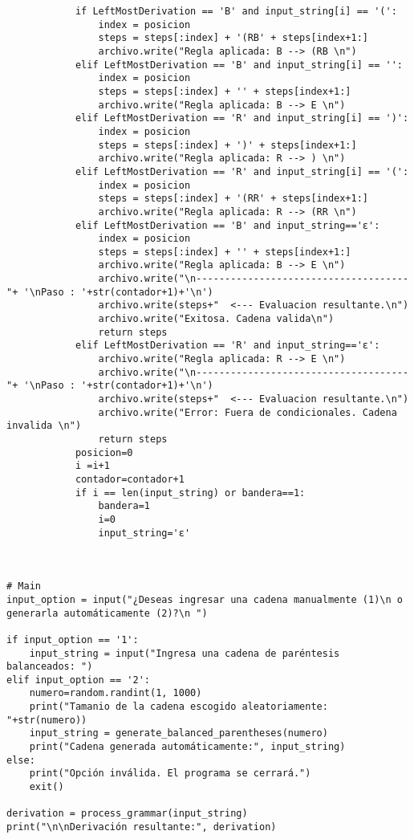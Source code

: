 \begin{lstlisting}
            if LeftMostDerivation == 'B' and input_string[i] == '(':
                index = posicion
                steps = steps[:index] + '(RB' + steps[index+1:]  
                archivo.write("Regla aplicada: B --> (RB \n")
            elif LeftMostDerivation == 'B' and input_string[i] == '':
                index = posicion
                steps = steps[:index] + '' + steps[index+1:]  
                archivo.write("Regla aplicada: B --> E \n")
            elif LeftMostDerivation == 'R' and input_string[i] == ')':
                index = posicion
                steps = steps[:index] + ')' + steps[index+1:]  
                archivo.write("Regla aplicada: R --> ) \n")
            elif LeftMostDerivation == 'R' and input_string[i] == '(':
                index = posicion
                steps = steps[:index] + '(RR' + steps[index+1:]  
                archivo.write("Regla aplicada: R --> (RR \n")
            elif LeftMostDerivation == 'B' and input_string=='ε':
                index = posicion
                steps = steps[:index] + '' + steps[index+1:]
                archivo.write("Regla aplicada: B --> E \n")
                archivo.write("\n-------------------------------------"+ '\nPaso : '+str(contador+1)+'\n')
                archivo.write(steps+"  <--- Evaluacion resultante.\n")
                archivo.write("Exitosa. Cadena valida\n")
                return steps
            elif LeftMostDerivation == 'R' and input_string=='ε':
                archivo.write("Regla aplicada: R --> E \n")
                archivo.write("\n-------------------------------------"+ '\nPaso : '+str(contador+1)+'\n')
                archivo.write(steps+"  <--- Evaluacion resultante.\n")
                archivo.write("Error: Fuera de condicionales. Cadena invalida \n")
                return steps
            posicion=0 
            i =i+1
            contador=contador+1
            if i == len(input_string) or bandera==1:
                bandera=1
                i=0
                input_string='ε'



# Main
input_option = input("¿Deseas ingresar una cadena manualmente (1)\n o generarla automáticamente (2)?\n ")

if input_option == '1':
    input_string = input("Ingresa una cadena de paréntesis balanceados: ")
elif input_option == '2':
    numero=random.randint(1, 1000)
    print("Tamanio de la cadena escogido aleatoriamente: "+str(numero))
    input_string = generate_balanced_parentheses(numero)
    print("Cadena generada automáticamente:", input_string)
else:
    print("Opción inválida. El programa se cerrará.")
    exit()

derivation = process_grammar(input_string)
print("\n\nDerivación resultante:", derivation)

\end{lstlisting}